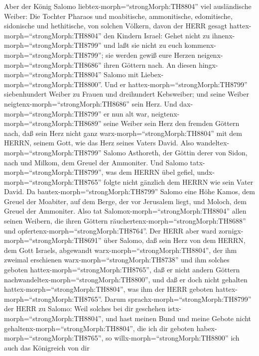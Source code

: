  Aber der König Salomo liebtex-morph=``strongMorph:TH8804''
viel ausländische Weiber: Die Tochter Pharaos und moabitische,
ammonitische, edomitische, sidonische und hethitische,  von
solchen Völkern, davon der HERR gesagt
hattex-morph=``strongMorph:TH8804'' den Kindern Israel: Gehet nicht zu
ihnenx-morph=``strongMorph:TH8799'' und laßt sie nicht zu euch
kommenx-morph=``strongMorph:TH8799''; sie werden gewiß eure Herzen
neigenx-morph=``strongMorph:TH8686'' ihren Göttern nach. An diesen
hingx-morph=``strongMorph:TH8804'' Salomo mit
Liebex-morph=``strongMorph:TH8800''.  Und er
hattex-morph=``strongMorph:TH8799'' siebenhundert Weiber zu Frauen und
dreihundert Kebsweiber; und seine Weiber
neigtenx-morph=``strongMorph:TH8686'' sein Herz.  Und
dax-morph=``strongMorph:TH8799'' er nun alt war,
neigtenx-morph=``strongMorph:TH8689'' seine Weiber sein Herz den fremden
Göttern nach, daß sein Herz nicht ganz warx-morph=``strongMorph:TH8804''
mit dem HERRN, seinem Gott, wie das Herz seines Vaters David.
 Also wandeltex-morph=``strongMorph:TH8799'' Salomo
Asthoreth, der Göttin derer von Sidon, nach und Milkom, dem Greuel der
Ammoniter.  Und Salomo tatx-morph=``strongMorph:TH8799'',
was dem HERRN übel gefiel, undx-morph=``strongMorph:TH8765'' folgte
nicht gänzlich dem HERRN wie sein Vater David.  Da
bautex-morph=``strongMorph:TH8799'' Salomo eine Höhe Kamos, dem Greuel
der Moabiter, auf dem Berge, der vor Jerusalem liegt, und Moloch, dem
Greuel der Ammoniter.  Also tat
Salomox-morph=``strongMorph:TH8804'' allen seinen Weibern, die ihren
Göttern räuchertenx-morph=``strongMorph:TH8688'' und
opfertenx-morph=``strongMorph:TH8764''.  Der HERR aber ward
zornigx-morph=``strongMorph:TH8691'' über Salomo, daß sein Herz von dem
HERRN, dem Gott Israels, abgewandt warx-morph=``strongMorph:TH8804'',
der ihm zweimal erschienen warx-morph=``strongMorph:TH8738''
 und ihm solches geboten
hattex-morph=``strongMorph:TH8765'', daß er nicht andern Göttern
nachwandeltex-morph=``strongMorph:TH8800'', und daß er doch nicht
gehalten hattex-morph=``strongMorph:TH8804'', was ihm der HERR geboten
hattex-morph=``strongMorph:TH8765''.  Darum
sprachx-morph=``strongMorph:TH8799'' der HERR zu Salomo: Weil solches
bei dir geschehen istx-morph=``strongMorph:TH8804'', und hast meinen
Bund und meine Gebote nicht gehaltenx-morph=``strongMorph:TH8804'', die
ich dir geboten habex-morph=``strongMorph:TH8765'', so
willx-morph=``strongMorph:TH8800'' ich auch das Königreich von dir
